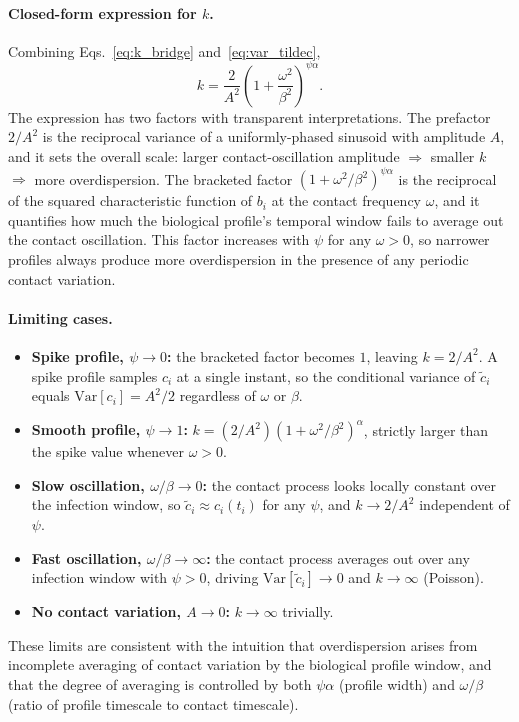 \paragraph{Closed-form expression for $k$.} Combining Eqs.~\ref{eq:k_bridge} and~\ref{eq:var_tildec},
%
\begin{equation}
	\boxed{\;
	k = \frac{2}{A^2}\left(1 + \frac{\omega^2}{\beta^2}\right)^{\psi\alpha}.
	\;}
	\label{eq:k_periodic}
\end{equation}
%
The expression has two factors with transparent interpretations. The prefactor $2/A^2$ is the reciprocal variance of a uniformly-phased sinusoid with amplitude $A$, and it sets the overall scale: larger contact-oscillation amplitude $\Rightarrow$ smaller $k$ $\Rightarrow$ more overdispersion. The bracketed factor $(1 + \omega^2/\beta^2)^{\psi\alpha}$ is the reciprocal of the squared characteristic function of $b_i$ at the contact frequency $\omega$, and it quantifies how much the biological profile's temporal window fails to average out the contact oscillation. This factor increases with $\psi$ for any $\omega > 0$, so narrower profiles always produce more overdispersion in the presence of any periodic contact variation.

\paragraph{Limiting cases.}
\begin{itemize}
	\item \textbf{Spike profile, $\psi \to 0$:} the bracketed factor becomes $1$, leaving $k = 2/A^2$. A spike profile samples $c_i$ at a single instant, so the conditional variance of $\tilde{c}_i$ equals $\text{Var}[c_i] = A^2/2$ regardless of $\omega$ or $\beta$.
	\item \textbf{Smooth profile, $\psi \to 1$:} $k = (2/A^2)(1 + \omega^2/\beta^2)^{\alpha}$, strictly larger than the spike value whenever $\omega > 0$.
	\item \textbf{Slow oscillation, $\omega/\beta \to 0$:} the contact process looks locally constant over the infection window, so $\tilde{c}_i \approx c_i(t_i)$ for any $\psi$, and $k \to 2/A^2$ independent of $\psi$.
	\item \textbf{Fast oscillation, $\omega/\beta \to \infty$:} the contact process averages out over any infection window with $\psi > 0$, driving $\text{Var}[\tilde{c}_i] \to 0$ and $k \to \infty$ (Poisson).
	\item \textbf{No contact variation, $A \to 0$:} $k \to \infty$ trivially.
\end{itemize}
%
These limits are consistent with the intuition that overdispersion arises from incomplete averaging of contact variation by the biological profile window, and that the degree of averaging is controlled by both $\psi\alpha$ (profile width) and $\omega/\beta$ (ratio of profile timescale to contact timescale).

